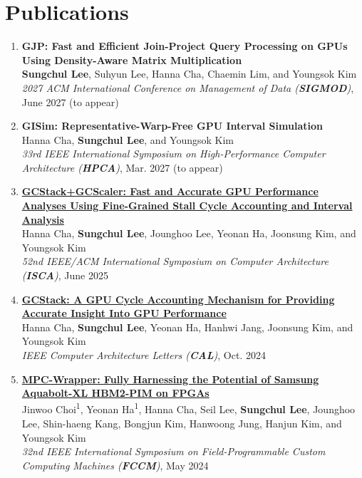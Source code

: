 \documentclass[11pt,a4paper]{article}
\newenvironment{publist}
  {\begin{enumerate}[leftmargin=2.2em, labelsep=.6em, align=left, itemsep=5pt, topsep=0pt]}
  {\end{enumerate}}
\newcommand{\me}{\textbf{Sungchul Lee}}
\newcommand{\venue}[1]{\textbf{#1}}
\begin{document}
\section{Publications}
\begin{publist}
  \item[{[5]}] \textbf{GJP: Fast and Efficient Join-Project Query Processing on GPUs Using Density-Aware Matrix Multiplication}\\
    {\small \me, Suhyun Lee, Hanna Cha, Chaemin Lim, and Youngsok Kim\\
    \textit{2027 ACM International Conference on Management of Data (\venue{SIGMOD})}, June 2027 (to appear)}

  \item[{[4]}] \textbf{GISim: Representative-Warp-Free GPU Interval Simulation}\\
    {\small Hanna Cha, \me, and Youngsok Kim\\
    \textit{33rd IEEE International Symposium on High-Performance Computer Architecture (\venue{HPCA})}, Mar. 2027 (to appear)}
    
  \item[{[3]}] \textbf{\href{https://doi.org/10.1145/3695053.3731068}{GCStack+GCScaler: Fast and Accurate GPU Performance Analyses Using Fine-Grained Stall Cycle Accounting and Interval Analysis}}\\
    {\small Hanna Cha, \me, Jounghoo Lee, Yeonan Ha, Joonsung Kim, and Youngsok Kim\\
    \textit{52nd IEEE/ACM International Symposium on Computer Architecture (\venue{ISCA})}, June 2025}

  \item[{[2]}] \textbf{\href{https://doi.org/10.1109/LCA.2024.3476909}{GCStack: A GPU Cycle Accounting Mechanism for Providing Accurate Insight Into GPU Performance}}\\
    {\small Hanna Cha, \me, Yeonan Ha, Hanhwi Jang, Joonsung Kim, and Youngsok Kim\\
    \textit{IEEE Computer Architecture Letters (\venue{CAL})}, Oct. 2024}

  \item[{[1]}] \textbf{\href{https://ieeexplore.ieee.org/document/10653651}{MPC-Wrapper: Fully Harnessing the Potential of Samsung Aquabolt-XL HBM2-PIM on FPGAs}}\\
    {\small Jinwoo Choi\textsuperscript{1}, Yeonan Ha\textsuperscript{1}, Hanna Cha, Seil Lee, \me, Jounghoo Lee, Shin-haeng Kang, Bongjun Kim, Hanwoong Jung, Hanjun Kim, and Youngsok Kim\\
    \textit{32nd IEEE International Symposium on Field-Programmable Custom Computing Machines (\venue{FCCM})}, May 2024}
\end{publist}
\smallskip
\end{document}
